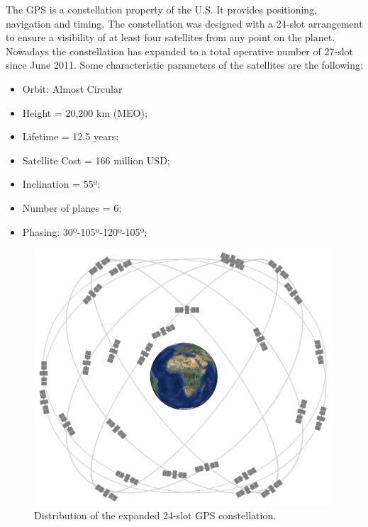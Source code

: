 The GPS is a constellation property of the U.S. It provides positioning, navigation and timing. The constellation was designed with a 24-slot arrangement to ensure a visibility of at least four satellites from any point on the planet. Nowadays the constellation has expanded to a total operative number of 27-slot since June 2011. Some characteristic parameters of the satellites are the following:

\begin{itemize}
\item Orbit: Almost Circular
\item Height = 20,200 km (MEO);
\item Lifetime = 12.5 years;
\item Satellite Cost = 166 million USD;
\item Inclination = 55º;
\item Number of planes = 6;
\item Phasing: 30º-105º-120º-105º;
\end{itemize}

\begin{figure}[H]
\begin{center}
\includegraphics[scale=0.16]{GPSconstellation.jpg}
\caption[Distribution of the expanded 24-slot GPS constellation]{Distribution of the expanded 24-slot GPS constellation.\cite{GPS}}
\end{center}
\end{figure}